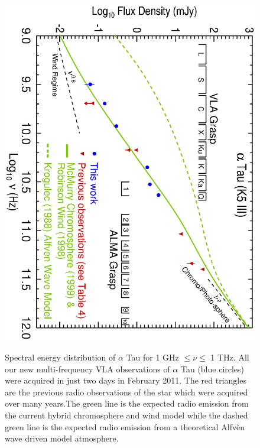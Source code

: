 \documentclass[iop]{emulateapj}
\begin{document}
\begin{figure}
\includegraphics[trim = 0mm 0mm 0mm 20mm, clip,scale=0.65, angle=90]{fig2.ps}
\\
\caption{Spectral energy distribution of $\alpha$ Tau for 1 GHz $\leq \nu \leq$ 1 THz. All our new multi-frequency VLA observations of $\alpha$ Tau (blue circles) were acquired in just two days in February 2011. The red triangles are the previous radio observations of the star which were acquired over many years.The green line is the expected radio emission from the current hybrid chromosphere and wind model while the dashed  green line is the expected radio emission from a theoretical Alfv\`en wave driven model atmosphere.}
\label{fig:fig2}
\end{figure}
\end{document}
